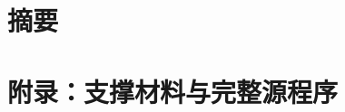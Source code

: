 \documentclass[UTF8,a4paper,zihao=-4,fontset=fandol]{ctexart}
\begin{document}
\setcounter{page}{1}
\PaperKitTitle{\PaperTitle}
\section*{摘要}

\keywords{\PaperKeywords}

\label{abstract-end}\clearpage
\label{body-start}



\clearpage
\appendix
\section*{附录：支撑材料与完整源程序}\label{appendix-start}

\end{document}
